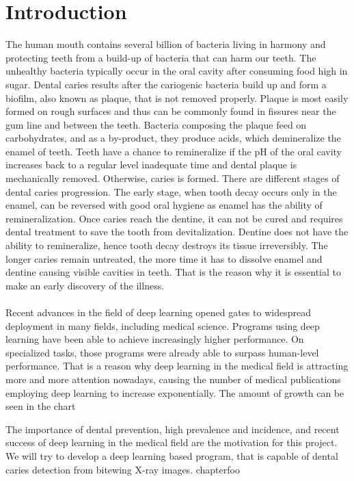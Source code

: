 \section{Introduction}
The human mouth contains several billion of bacteria living in harmony and protecting teeth from a build-up of bacteria that can harm our teeth. The unhealthy bacteria typically occur in the oral cavity after consuming food high in sugar. Dental caries results after the cariogenic bacteria build up and form a biofilm, also known as plaque, that is not removed properly. Plaque is most easily formed on rough surfaces and thus can be commonly found in fissures near the gum line and between the teeth. Bacteria composing the plaque feed on carbohydrates, and as a by-product, they produce acids, which demineralize the enamel of teeth. Teeth have a chance to remineralize if the pH of the oral cavity increases back to a regular level inadequate time and dental plaque is mechanically removed. Otherwise, caries is formed. There are different stages of dental caries progression. The early stage, when tooth decay occurs only in the enamel, can be reversed with good oral hygiene as enamel has the ability of remineralization. Once caries reach the dentine, it can not be cured and requires dental treatment to save the tooth from devitalization. Dentine does not have the ability to remineralize, hence tooth decay destroys its tissue irreversibly. The longer caries remain untreated, the more time it has to dissolve enamel and dentine causing visible cavities in teeth. That is the reason why it is essential to make an early discovery of the illness. \\
\\
Recent advances in the field of deep learning opened gates to widespread deployment in many fields, including medical science. Programs using deep learning have been able to achieve increasingly higher performance. On specialized tasks, those programs were already able to surpass human-level performance. That is a reason why  deep learning in the medical field is attracting more and more attention nowadays, causing the number of medical publications employing deep learning to increase exponentially. The amount of growth can be seen in the chart

The importance of dental prevention, high prevalence and incidence, and recent success of deep learning in the medical field are the motivation for this project. We will try to develop a deep learning based program, that is capable of dental caries detection from bitewing X-ray images.
chapter{foo}